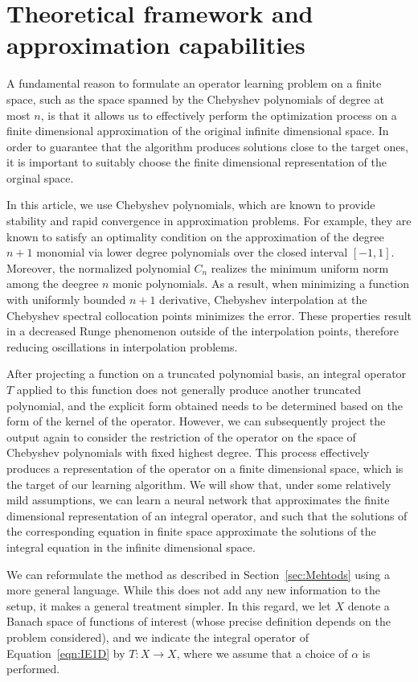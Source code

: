 \documentclass[11pt,fleqn]{amsart} %
\begin{document}
	\section{Theoretical framework and approximation capabilities}\label{sec:Theoretical}
	
	 A fundamental reason to formulate an operator learning problem on a finite space, such as the space spanned by the Chebyshev polynomials of degree at most $n$, is that it allows us to effectively perform the optimization process on a finite dimensional approximation of the original infinite dimensional space. In order to guarantee that the algorithm produces solutions close to the target ones, it is important to suitably choose the finite dimensional representation of the orginal space. 
		
	In this article, we use Chebyshev polynomials, which are known to provide stability and rapid convergence in approximation problems. For example, they are known to satisfy an optimality condition on the approximation of the degree $n+1$ monomial via lower degree polynomials over the closed interval $[-1,1]$. Moreover, the normalized polynomial $C_n$ realizes the minimum uniform norm among the deegree $n$ monic polynomials. As a result, when minimizing a function with uniformly bounded $n+1$ derivative, Chebyshev interpolation at the Chebyshev spectral collocation points minimizes the error. These properties result in a decreased Runge phenomenon outside of the interpolation points, therefore reducing oscillations in interpolation problems.  
	
	After projecting a function on a truncated polynomial basis, an integral operator $T$ applied to this function does not generally produce another truncated polynomial, and the explicit form obtained needs to be determined based on the form of the kernel of the operator. However, we can subsequently project the output again to consider the restriction of the operator on the space of Chebyshev polynomials with fixed highest degree. This process effectively produces a representation of the operator on a finite dimensional space, which is the target of our learning algorithm. We will show that, under some relatively mild assumptions, we can learn a neural network that approximates the finite dimensional representation of an integral operator, and such that the solutions of the corresponding equation in finite space approximate the solutions of the integral equation in the infinite dimensional space.  
	
	We can reformulate the method as described in Section~\ref{sec:Mehtods} using a more general language. While this does not add any new information to the setup, it makes a general treatment simpler. In this regard, we let $X$ denote a Banach space of functions of interest (whose precise definition depends on the problem considered), and we indicate the integral operator of Equation~\eqref{eqn:IE1D} by $T : X \longrightarrow X$, where we assume that a choice of $\alpha$ is performed. 
	
\end{document}
